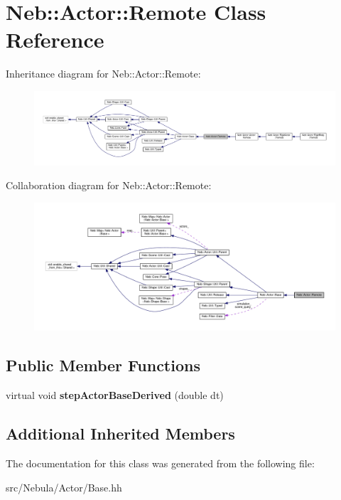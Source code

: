 \hypertarget{classNeb_1_1Actor_1_1Remote}{\section{Neb\-:\-:Actor\-:\-:Remote Class Reference}
\label{classNeb_1_1Actor_1_1Remote}
}


Inheritance diagram for Neb\-:\-:Actor\-:\-:Remote\-:
\nopagebreak
\begin{figure}[H]
\begin{center}
\leavevmode
\includegraphics[width=350pt]{classNeb_1_1Actor_1_1Remote__inherit__graph}
\end{center}
\end{figure}


Collaboration diagram for Neb\-:\-:Actor\-:\-:Remote\-:
\nopagebreak
\begin{figure}[H]
\begin{center}
\leavevmode
\includegraphics[width=350pt]{classNeb_1_1Actor_1_1Remote__coll__graph}
\end{center}
\end{figure}
\subsection*{Public Member Functions}
\begin{DoxyCompactItemize}
\item 
\hypertarget{classNeb_1_1Actor_1_1Remote_a176e6f54d8ac88648ec2067094add85e}{virtual void {\bfseries step\-Actor\-Base\-Derived} (double dt)}\label{classNeb_1_1Actor_1_1Remote_a176e6f54d8ac88648ec2067094add85e}

\end{DoxyCompactItemize}
\subsection*{Additional Inherited Members}


The documentation for this class was generated from the following file\-:\begin{DoxyCompactItemize}
\item 
src/\-Nebula/\-Actor/Base.\-hh\end{DoxyCompactItemize}
